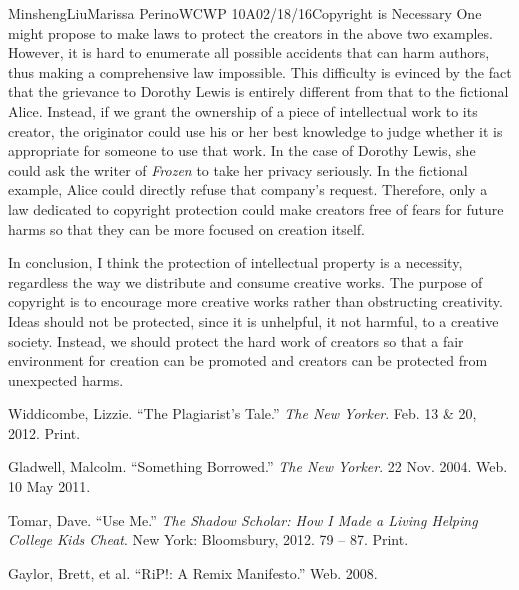 \documentclass[12pt,letterpaper]{article}
\begin{document}
\begin{mla}{Minsheng}{Liu}{Marissa Perino}{WCWP 10A}{02/18/16}{Copyright is Necessary}
One might propose to make laws to protect the creators in the above two
examples. However, it is hard to enumerate all possible accidents that
can harm authors, thus making a comprehensive law impossible. This
difficulty is evinced by the fact that the grievance to Dorothy Lewis is
entirely different from that to the fictional Alice. Instead, if we
grant the ownership of a piece of intellectual work to its creator, the
originator could use his or her best knowledge to judge whether it is
appropriate for someone to use that work. In the case of Dorothy Lewis,
she could ask the writer of \emph{Frozen} to take her privacy seriously.
In the fictional example, Alice could directly refuse that company's
request. Therefore, only a law dedicated to copyright protection could
make creators free of fears for future harms so that they can be more
focused on creation itself.

In conclusion, I think the protection of intellectual property is a
necessity, regardless the way we distribute and consume creative works.
The purpose of copyright is to encourage more creative works rather than
obstructing creativity. Ideas should not be protected, since it is
unhelpful, it not harmful, to a creative society. Instead, we should
protect the hard work of creators so that a fair environment for
creation can be promoted and creators can be protected from unexpected
harms.

\begin{workscited}
\bibent Widdicombe, Lizzie. ``The Plagiarist's Tale.'' \textit{The New Yorker}.
Feb. 13 \& 20, 2012. Print.

\bibent Gladwell, Malcolm. ``Something Borrowed.'' \textit{The New Yorker}.
22 Nov. 2004. Web. 10 May 2011.

\bibent Tomar, Dave. ``Use Me.'' \textit{The Shadow Scholar: How I Made a Living
  Helping College Kids Cheat}.
New York: Bloomsbury, 2012. 79 -- 87. Print.

\bibent Gaylor, Brett, et al. ``RiP!: A Remix Manifesto.'' Web. 2008.
\end{workscited}
\end{mla}
\end{document}
